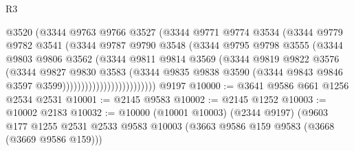 \begin{lexlean}{R3}
\begin{coremodule}
                                @3520
                                (@3344
                                  @9763
                                  @9766
                                  @3527
                                  (@3344
                                    @9771
                                    @9774
                                    @3534
                                    (@3344
                                      @9779
                                      @9782
                                      @3541
                                      (@3344
                                        @9787
                                        @9790
                                        @3548
                                        (@3344
                                          @9795
                                          @9798
                                          @3555
                                          (@3344
                                            @9803
                                            @9806
                                            @3562
                                            (@3344
                                              @9811
                                              @9814
                                              @3569
                                              (@3344
                                                @9819
                                                @9822
                                                @3576
                                                (@3344
                                                  @9827
                                                  @9830
                                                  @3583
                                                  (@3344
                                                    @9835
                                                    @9838
                                                    @3590
                                                    (@3344
                                                      @9843
                                                      @9846
                                                      @3597
                                                      @3599)))))))))))))))))))))))))
    @9197
@10000 := @3641 @9586 @661 @1256 @2534 @2531
@10001 := @2145 @9583
@10002 := @2145 @1252
@10003 := @10002 @2183
@10032 := @10000
    (@10001 @10003)
    (@2344 @9197)
    (@9603
      @177
      @1255
      @2531
      @2533
      @9583
      @10003
      (@3663 @9586 @159 @9583 (@3668 (@3669 @9586 @159)))

\end{coremodule}
\end{lexlean}
